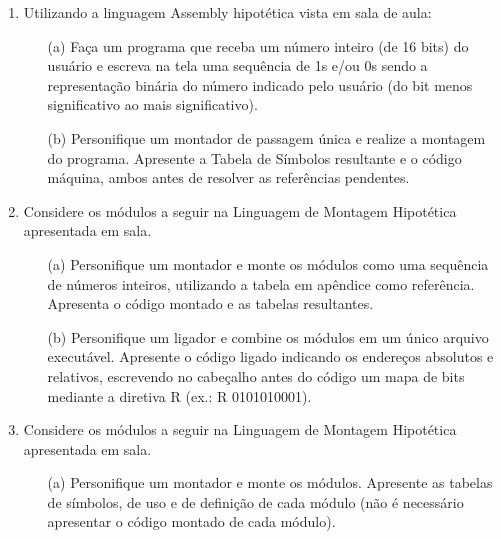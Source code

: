 \begin{enumerate}[resume]
    \item
    Utilizando a linguagem Assembly hipotética vista em sala de aula:
    \begin{itemize}
        \item [(a)]
        Faça um programa que receba um número inteiro (de 16 bits) do usuário
        e escreva na tela uma sequência de 1s e/ou 0s 
        sendo a representação binária do número indicado pelo usuário 
        (do bit menos significativo ao mais significativo).

        \item [(b)]
        Personifique um montador de passagem única e realize a montagem do programa.
        Apresente a Tabela de Símbolos resultante e o código máquina,
        ambos antes de resolver as referências pendentes.
    \end{itemize}

    \item
    Considere os módulos a seguir na Linguagem de Montagem Hipotética apresentada em sala.
    \begin{multicols}{2}
        \columnbreak
    \end{multicols}

    \begin{itemize}
        \item [(a)]
        Personifique um montador e monte os módulos como uma sequência de números inteiros,
        utilizando a tabela em apêndice como referência. 
        Apresenta o código montado e as tabelas resultantes.

        \item [(b)]
        Personifique um ligador e combine os módulos em um único arquivo executável.
        Apresente o código ligado indicando os endereços absolutos e relativos,
        escrevendo no cabeçalho antes do código um mapa de bits mediante a diretiva R
        (ex.: R 0101010001). 
    \end{itemize}

    \item 
    Considere os módulos a seguir na Linguagem de Montagem Hipotética apresentada em sala.
    \begin{multicols}{3}
        \columnbreak
        \columnbreak
    \end{multicols}
    \begin{itemize}
        \item [(a)]
        Personifique um montador e monte os módulos. 
        Apresente as tabelas de símbolos, de uso e de definição de cada módulo
        (não é necessário apresentar o código montado de cada módulo).


\end{itemize}
\end{enumerate}
